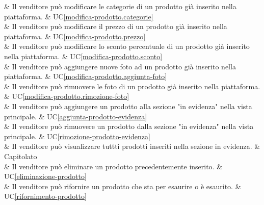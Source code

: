  & Il venditore può modificare le categorie di un prodotto già inserito nella piattaforma. & UC\ref{modifica-prodotto.categorie} \\
    
 & Il venditore può modificare il prezzo di un prodotto già inserito nella piattaforma. & UC\ref{modifica-prodotto.prezzo} \\
    
 & Il venditore può modificare lo sconto percentuale di un prodotto già inserito nella piattaforma. & UC\ref{modifica-prodotto.sconto} \\
    
 & Il venditore può aggiungere nuove foto ad un prodotto già inserito nella piattaforma. & UC\ref{modifica-prodotto.aggiunta-foto} \\
    
 & Il venditore può rimuovere le foto di un prodotto già inserito nella piattaforma. & UC\ref{modifica-prodotto.rimozione-foto} \\
    
 & Il venditore può aggiungere un prodotto alla sezione "in evidenza" nella vista principale. & UC\ref{aggiunta-prodotto-evidenza} \\
    
 & Il venditore può rimuovere un prodotto dalla sezione "in evidenza" nella vista principale. & UC\ref{rimozione-prodotto-evidenza} \\

 & Il venditore può visualizzare tuttti prodotti inseriti nella sezione in evidenza. & Capitolato \\
    
 & Il venditore può eliminare un prodotto precedentemente inserito. & UC\ref{eliminazione-prodotto} \\
    
 & Il venditore può rifornire un prodotto che sta per esaurire o è esaurito. & UC\ref{rifornimento-prodotto} \\